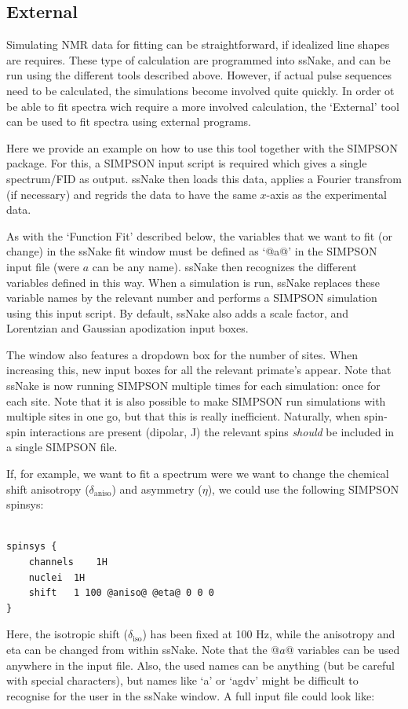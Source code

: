\documentclass[11pt,a4paper]{article}
\begin{document}
\subsection{External}
Simulating NMR data for fitting can be straightforward, if idealized line shapes are requires. These
type of calculation are programmed into ssNake, and can be run using the different tools described
above. However, if actual pulse sequences need to be calculated, the simulations become involved
quite quickly. In order ot be able to fit spectra wich require a more involved calculation, the
`External' tool can be used to fit spectra using external programs.


Here we provide an example on how to use this tool together with the SIMPSON package\cite{Bak2000SIMPSON,Tosner2014Computer,Tosner2009Optimal}.
For this, a SIMPSON input script is
required which gives a single spectrum/FID as output. ssNake then loads this data, applies a Fourier
transfrom (if necessary) and regrids the data to have the same $x$-axis as the experimental data.

As with the `Function Fit' described below, the variables that we want to fit (or change) in the
ssNake fit window must be defined as `@a@' in the SIMPSON input file (were $a$ can be any name). ssNake
then recognizes the different variables defined in this way. When a simulation is run, ssNake
replaces these variable names by the relevant number and performs a SIMPSON simulation using this
input script. By default, ssNake also adds a scale factor, and Lorentzian and Gaussian apodization
input boxes.

The window also features a dropdown box for the number of sites. When increasing this, new input
boxes for all the relevant primate's appear. Note that ssNake is now running SIMPSON multiple times
for each simulation: once for each site. Note that it is also possible to make SIMPSON run
simulations with multiple sites in one go, but that this is really inefficient. Naturally, when
spin-spin interactions are present (dipolar, J) the relevant spins \textit{should} be included in a single
SIMPSON file.


If, for example, we want to fit a spectrum were we want to change the chemical shift anisotropy
($\delta_\text{aniso}$) and asymmetry ($\eta$), we could use the following SIMPSON spinsys:

\lstset{language=tcl}          %

\begin{lstlisting}[frame=single]  % Start your code-block

spinsys {
    channels	1H
    nuclei	1H
    shift	1 100 @aniso@ @eta@ 0 0 0
}
\end{lstlisting}
Here, the isotropic shift ($\delta_\text{iso}$) has been fixed at 100 Hz, while the anisotropy and
eta can be changed from within ssNake. Note that the @$a$@ variables can be used anywhere in the
input file. Also, the used names can be anything (but be careful with special characters), but names
like `a' or `agdv' might be difficult to recognise for the user in the ssNake window.
A full input file could look like:
\end{document}
